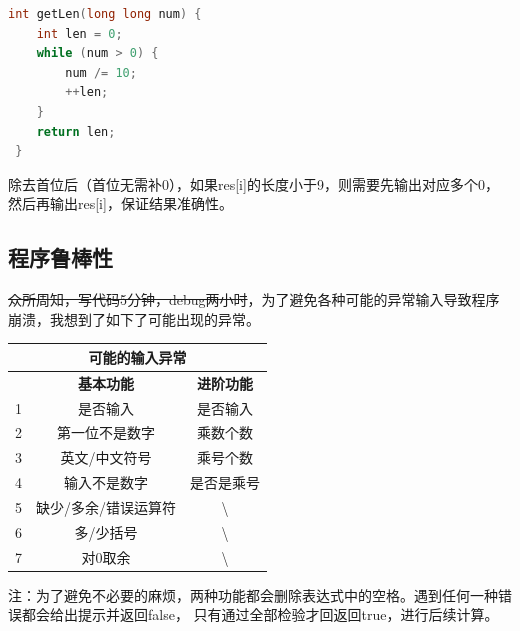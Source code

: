 \documentclass[a4paper, 11pt, UTF8]{ctexart}
\begin{document}
\begin{lstlisting}[language=C++, basicstyle=\ttfamily]
 int getLen(long long num) {
    int len = 0;
    while (num > 0) {
        num /= 10;
        ++len;
    }
    return len;
 }
\end{lstlisting}

除去首位后（首位无需补0），如果res[i]的长度小于9，则需要先输出对应多个0，然后再输出res[i]，保证结果准确性。

\subsection{程序鲁棒性}

\sout{众所周知，写代码5分钟，debug两小时}，为了避免各种可能的异常输入导致程序崩溃，我想到了如下了可能出现的异常。

\begin{table}[H]
    \centering
    \begin{tabular}{|ccc|}
        \hline
        \multicolumn{3}{|c|}{\textbf{可能的输入异常}}                                           \\ \hline
        \multicolumn{1}{|c|}{}  & \multicolumn{1}{c|}{\textbf{基本功能}}    & \textbf{进阶功能} \\ \hline
        \multicolumn{1}{|c|}{1} & \multicolumn{1}{c|}{是否输入}             & 是否输入          \\ \hline
        \multicolumn{1}{|c|}{2} & \multicolumn{1}{c|}{第一位不是数字}       & 乘数个数          \\ \hline
        \multicolumn{1}{|c|}{3} & \multicolumn{1}{c|}{英文/中文符号}        & 乘号个数          \\ \hline
        \multicolumn{1}{|c|}{4} & \multicolumn{1}{c|}{输入不是数字}         & 是否是乘号        \\ \hline
        \multicolumn{1}{|c|}{5} & \multicolumn{1}{c|}{缺少/多余/错误运算符} & \textbackslash{}  \\ \hline
        \multicolumn{1}{|c|}{6} & \multicolumn{1}{c|}{多/少括号}            & \textbackslash{}  \\ \hline
        \multicolumn{1}{|c|}{7} & \multicolumn{1}{c|}{对0取余}              & \textbackslash{}  \\ \hline
    \end{tabular}
\end{table}

注：为了避免不必要的麻烦，两种功能都会删除表达式中的空格。遇到任何一种错误都会给出提示并返回false，
只有通过全部检验才回返回true，进行后续计算。
\end{document}
